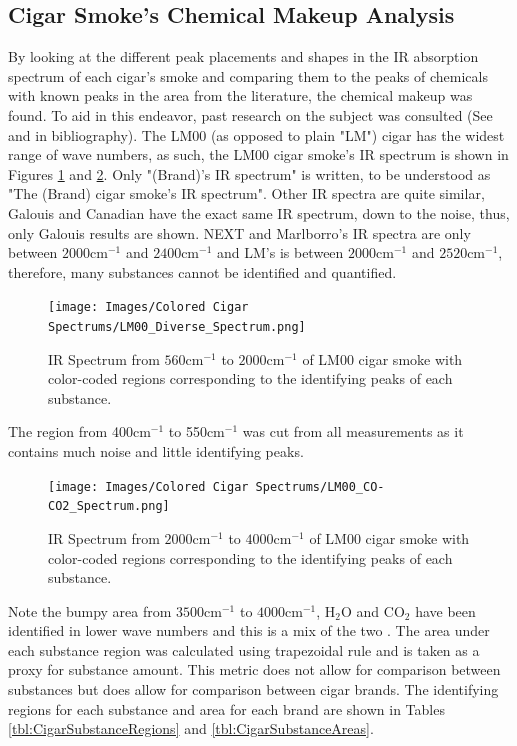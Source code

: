 \documentclass[reprint,amsmath,amssymb,aps, prl,superscriptaddress]{revtex4-2}
\begin{document}
\subsection{Cigar Smoke's Chemical Makeup Analysis}
By looking at the different peak placements and shapes in the IR absorption spectrum of each cigar's smoke and comparing them to the peaks of chemicals with known peaks in the area from the literature\cite{NISTwebook}, 
the chemical makeup was found. To aid in this endeavor, past research
on the subject was consulted (See \cite{IRCEllSMOKE} and \cite{FTIRSPECTRAOFSMOKE} in bibliography). The LM00 (as opposed to plain "LM") cigar has the widest range of wave numbers, as such, the LM00 cigar smoke's IR spectrum is shown in Figures \ref{fig:DiverseLM} and \ref{fig:COCO2LM}. Only "(Brand)'s IR spectrum" is written, to be understood as "The (Brand) cigar smoke's IR spectrum". Other IR spectra are quite similar, Galouis and Canadian have the exact same IR spectrum, down to the noise, thus, only Galouis results are shown. NEXT and Marlborro's IR spectra are only between $2000\text{cm}^{-1}$ and $2400\text{cm}^{-1}$ and LM's is between $2000\text{cm}^{-1}$ and $2520\text{cm}^{-1}$, therefore, many substances cannot be identified and quantified.
\begin{figure}[H]
    \texttt{[image: Images/Colored Cigar Spectrums/LM00\_Diverse\_Spectrum.png]} 
    \caption{IR Spectrum from $560 \text{cm}^{-1}$ to $2000\text{cm}^{-1}$ of LM00 cigar smoke with color-coded regions corresponding to the identifying peaks of each substance.}
    \label{fig:DiverseLM}
\end{figure}
The region from 400$\text{cm}^{-1}$ to 550$\text{cm}^{-1}$ was cut from all measurements as it contains much noise and little identifying peaks.
\begin{figure}[H]
    \texttt{[image: Images/Colored Cigar Spectrums/LM00\_CO-CO2\_Spectrum.png]} 
    \caption{IR Spectrum from $2000 \text{cm}^{-1}$ to $4000 \text{cm}^{-1}$ of LM00 cigar smoke with color-coded regions corresponding to the identifying peaks of each substance.}
    \label{fig:COCO2LM}
\end{figure}
Note the bumpy area from $3500 \text{cm}^{-1}$ to $4000 \text{cm}^{-1}$, $\text{H}_{2}\text{O}$ and $\text{CO}_{2}$ have been identified in lower wave numbers and this is a mix of the two \cite{FTIRSPECTRAOFSMOKE}.
The area under each substance region was calculated using trapezoidal rule \cite{numerical} 
and is taken as a proxy for substance amount. This metric does not allow for comparison between substances but does allow for comparison between cigar brands.
The identifying regions for each substance and area for each brand are shown in Tables \ref{tbl:CigarSubstanceRegions} and \ref{tbl:CigarSubstanceAreas}. %
\end{document}
